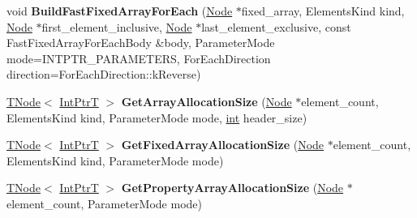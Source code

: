 \begin{DoxyCompactItemize}
\item 
\mbox{\label{classv8_1_1internal_1_1CodeStubAssembler_aaa2d2b9626d6eeda3696b432d800010c}} 
void {\bfseries Build\+Fast\+Fixed\+Array\+For\+Each} (\mbox{\hyperlink{classv8_1_1internal_1_1compiler_1_1Node}{Node}} $\ast$fixed\+\_\+array, Elements\+Kind kind, \mbox{\hyperlink{classv8_1_1internal_1_1compiler_1_1Node}{Node}} $\ast$first\+\_\+element\+\_\+inclusive, \mbox{\hyperlink{classv8_1_1internal_1_1compiler_1_1Node}{Node}} $\ast$last\+\_\+element\+\_\+exclusive, const Fast\+Fixed\+Array\+For\+Each\+Body \&body, Parameter\+Mode mode=I\+N\+T\+P\+T\+R\+\_\+\+P\+A\+R\+A\+M\+E\+T\+E\+RS, For\+Each\+Direction direction=For\+Each\+Direction\+::k\+Reverse)
\item 
\mbox{\label{classv8_1_1internal_1_1CodeStubAssembler_a7080f2f8c1a3606d439dd899838c962e}} 
\mbox{\hyperlink{classv8_1_1internal_1_1compiler_1_1TNode}{T\+Node}}$<$ \mbox{\hyperlink{structv8_1_1internal_1_1IntPtrT}{Int\+PtrT}} $>$ {\bfseries Get\+Array\+Allocation\+Size} (\mbox{\hyperlink{classv8_1_1internal_1_1compiler_1_1Node}{Node}} $\ast$element\+\_\+count, Elements\+Kind kind, Parameter\+Mode mode, \mbox{\hyperlink{classint}{int}} header\+\_\+size)
\item 
\mbox{\label{classv8_1_1internal_1_1CodeStubAssembler_a1085a6ed275b5dec6d0ad1fa36088832}} 
\mbox{\hyperlink{classv8_1_1internal_1_1compiler_1_1TNode}{T\+Node}}$<$ \mbox{\hyperlink{structv8_1_1internal_1_1IntPtrT}{Int\+PtrT}} $>$ {\bfseries Get\+Fixed\+Array\+Allocation\+Size} (\mbox{\hyperlink{classv8_1_1internal_1_1compiler_1_1Node}{Node}} $\ast$element\+\_\+count, Elements\+Kind kind, Parameter\+Mode mode)
\item 
\mbox{\label{classv8_1_1internal_1_1CodeStubAssembler_a3357d87a61874129e37de636006dc970}} 
\mbox{\hyperlink{classv8_1_1internal_1_1compiler_1_1TNode}{T\+Node}}$<$ \mbox{\hyperlink{structv8_1_1internal_1_1IntPtrT}{Int\+PtrT}} $>$ {\bfseries Get\+Property\+Array\+Allocation\+Size} (\mbox{\hyperlink{classv8_1_1internal_1_1compiler_1_1Node}{Node}} $\ast$element\+\_\+count, Parameter\+Mode mode)
\item 
\mbox{\label{classv8_1_1internal_1_1CodeStubAssembler_af844c46fd5f35fee3c78216709074491}} 

\end{DoxyCompactItemize}
